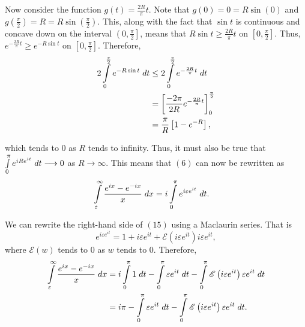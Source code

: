 \documentclass{article}
\begin{document}
\noindent Now consider the function $g(t) = \frac{2R}{\pi}t$.  Note that $g(0) = 0 = R\sin(0)$ and $g\left(\frac{\pi}{2}\right) = R = R\sin\left(\frac{\pi}{2}\right)$.  This, along with the fact that $\sin t$ is continuous and concave down on the interval $\left(0,\frac{\pi}{2}\right]$, means that $R\sin t \geq \frac{2R}{\pi}t$ on $\left[0,\frac{\pi}{2}\right]$.  Thus, $e^{-\frac{2R}{\pi}t} \geq e^{-R\sin t}$ on $\left[0, \frac{\pi}{2}\right]$.  Therefore,
\begin{align}
2\int\limits_0^{\frac{\pi}{2}} e^{-R\sin t} \hspace{1mm} dt &\leq 2\int\limits_0^{\frac{\pi}{2}} e^{-\frac{2R}{\pi}t} \hspace{1mm} dt \\
&= \left[\frac{-2\pi}{2R}e^{-\frac{2R}{\pi}t}\right]^{\frac{\pi}{2}}_0 \\
&= \frac{\pi}{R}\left[1-e^{-R}\right],
\end{align}

\noindent which tends to $0$ as $R$ tends to infinity.  Thus, it must also be true that $\int\limits_0^\pi e^{iRe^{it}} \hspace{1mm} dt \longrightarrow 0$ as $R\rightarrow \infty$.  This means that $(6)$ can now be rewritten as 
\begin{align}
\int\limits_{\varepsilon}^{\infty} \frac{e^{ix} - e^{-ix}}{x} \hspace{1mm} dx &= i\int\limits_0^{\pi}e^{i\varepsilon e^{it}} \hspace{1mm} dt.
\end{align}

\noindent We can rewrite the right-hand side of $(15)$ using a Maclaurin series.  That is $$e^{i\varepsilon e^{it}} = 1 + i\varepsilon e^{it} + \mathscr{E}\left(i\varepsilon e^{it}\right)i \varepsilon e^{it},$$ where $\mathscr{E}(w)$ tends to $0$ as $w$ tends to $0$.  Therefore,
\begin{align}
\int\limits_{\varepsilon}^{\infty} \frac{e^{ix} - e^{-ix}}{x} \hspace{1mm} dx &= i\int\limits_0^\pi 1 \hspace{1mm} dt - \int\limits_0^\pi \varepsilon e^{it} \hspace{1mm} dt - \int\limits_0^\pi \mathscr{E}\left(i\varepsilon e^{it}\right) \varepsilon e^{it} \hspace{1mm} dt \\
&= i\pi - \int\limits_0^\pi \varepsilon e^{it} \hspace{1mm} dt - \int\limits_0^\pi \mathscr{E}\left(i\varepsilon e^{it}\right) \varepsilon e^{it} \hspace{1mm} dt.
\end{align}
\end{document}
